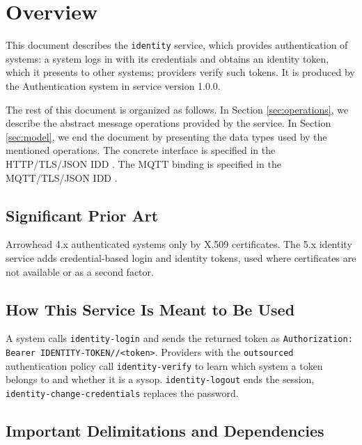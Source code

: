 \documentclass[a4paper]{arrowhead}
\begin{document}
\section{Overview}
\label{sec:overview}

This document describes the \texttt{identity} service, which provides authentication of systems: a system logs in with its credentials and obtains an identity token, which it presents to other systems; providers verify such tokens.
It is produced by the Authentication system \cite{auth-sysd} in service version 1.0.0.

The rest of this document is organized as follows.
In Section \ref{sec:operations}, we describe the abstract message operations provided by the service.
In Section \ref{sec:model}, we end the document by presenting the data types used by the mentioned operations.
The concrete interface is specified in the HTTP/TLS/JSON IDD \cite{auth-identity-http-idd}. The MQTT binding is specified in the MQTT/TLS/JSON IDD \cite{auth-identity-mqtt-idd}.

\subsection{Significant Prior Art}

Arrowhead 4.x authenticated systems only by X.509 certificates. The 5.x identity service adds credential-based login and identity tokens, used where certificates are not available or as a second factor.

\subsection{How This Service Is Meant to Be Used}

A system calls \texttt{identity-\allowbreak{}login} and sends the returned token as \texttt{Authorization: Bearer IDENTITY-\allowbreak{}TOKEN/\allowbreak{}/\allowbreak{}\textless{}token\textgreater{}}. Providers with the \texttt{outsourced} authentication policy call \texttt{identity-\allowbreak{}verify} to learn which system a token belongs to and whether it is a sysop. \texttt{identity-\allowbreak{}logout} ends the session, \texttt{identity-\allowbreak{}change-\allowbreak{}credentials} replaces the password.

\subsection{Important Delimitations and Dependencies}
\label{sec:delimitations}
\end{document}

